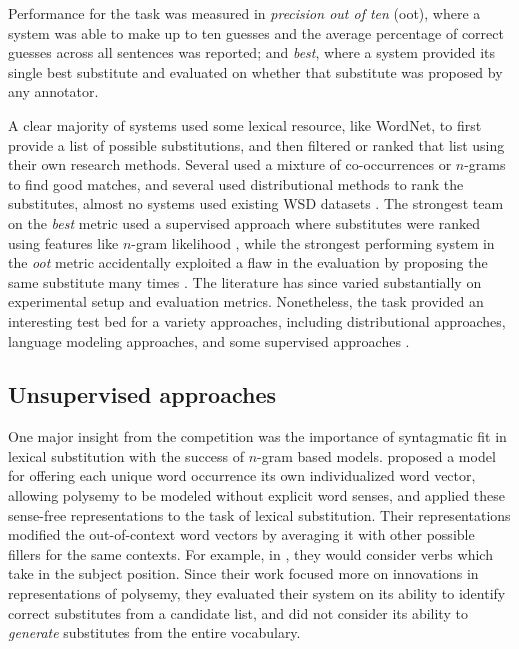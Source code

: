 Performance for the task was measured in {\em precision out of ten} (oot),
where a system was able to make up to ten guesses and the average percentage
of correct guesses across all sentences was reported; and {\em best}, where
a system provided its single best substitute and evaluated on whether that
substitute was proposed by any annotator.

A clear majority of systems used some lexical resource, like WordNet, to first
provide a list of possible substitutions, and then filtered or ranked that list
using their own research methods. Several used a mixture of co-occurrences or
$n$-grams to find good matches, and several used distributional methods to rank
the substitutes, almost no systems used existing WSD datasets
\cite{mccarthy:2007:semeval}. The strongest team on the {\em best} metric used a
supervised approach where substitutes were ranked
using features like $n$-gram likelihood \cite{yuret:2007:semeval}, while
the strongest performing system in the {\em oot} metric accidentally exploited
a flaw in the evaluation by proposing the same substitute many times
\cite{giuliano:2007:semeval}. The
literature has since varied substantially on experimental setup and evaluation
metrics. Nonetheless, the task provided an interesting test bed for a
variety approaches, including distributional approaches, language modeling
approaches, and some supervised approaches \cite{szarvas:2013:naacl}.

\subsection{Unsupervised approaches}

One major insight from the competition was the importance of syntagmatic fit in
lexical substitution with the success of $n$-gram based models.
 proposed a model for offering each unique word
occurrence its own individualized word vector, allowing polysemy to be modeled
without explicit word senses, and applied these sense-free representations
to the task of lexical substitution. Their representations modified the
out-of-context word vectors by averaging it with other possible fillers for
the same contexts.
For example, in , they would consider
verbs which take  in the subject position. Since their
work focused more on innovations in representations of polysemy, they
evaluated their system on its ability to identify correct substitutes from
a candidate list, and did not consider its ability to {\em generate} substitutes
from the entire vocabulary.


